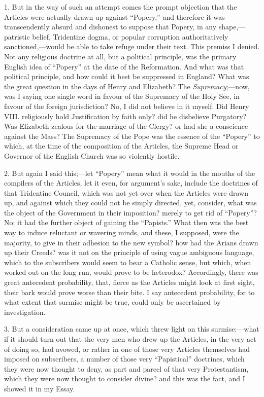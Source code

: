 1. But in the way of such an attempt comes the prompt objection that
the Articles were actually drawn up against ``Popery,'' and
therefore it was transcendently absurd and dishonest to suppose that
Popery, in any shape,—patristic belief, Tridentine dogma, or popular
corruption authoritatively sanctioned,—would be able to take refuge
under their text. This premiss I denied. Not any religious doctrine at
all, but a political principle, was the primary English idea of ``Popery''
at the date of the Reformation. And
what was that political principle, and how could it best be suppressed
in England? What was the great question in the days of Henry and
Elizabeth? The \emph{Supremacy};—now, was I saying one single word in favour
of the Supremacy of the Holy See, in favour of the foreign
jurisdiction? No, I did not believe in it myself. Did Henry VIII.
religiously hold Justification by faith only? did he disbelieve
Purgatory? Was Elizabeth zealous for the marriage of the Clergy? or had
she a conscience against the Mass? The Supremacy of the Pope was the
essence of the ``Popery'' to which, at the time of the composition
of the Articles, the Supreme Head or Governor of the English Church
was so violently hostile.

2. But again I said this;—let ``Popery'' mean what it would
in the mouths of the compilers of the Articles, let it even, for
argument's sake, include the doctrines of that Tridentine Council, which
was not yet over when the Articles were drawn up, and against which they
could not be simply directed, yet, consider, what was the
object of the Government in their imposition? merely to get rid of ``Popery''? No; it had the further object of gaining the
``Papists.'' What then was the best way to induce reluctant or
wavering minds, and these, I supposed, were the majority, to give in
their adhesion to the new symbol? how had the Arians drawn up their
Creeds? was it not on the principle of using vague ambiguous language,
which to the subscribers would seem to bear a Catholic sense, but
which, when worked out on the long run, would prove to be
heterodox? Accordingly, there was great antecedent probability, that,
fierce as the Articles might look at first sight, their bark would prove
worse than their bite. I say antecedent probability, for to what extent
that surmise might be true, could only be ascertained by investigation.

3. But a consideration came up at once, which threw light on this
surmise:—what if it should turn out that the very men who drew up the
Articles, in the very act of doing so, had avowed, or rather in one of
those very Articles themselves had imposed on subscribers, a number of
those very ``Papistical'' doctrines, which they were now thought
to deny, as part and parcel of that very Protestantism, which they were
now thought to consider divine? and this was the fact, and I showed it
in my Essay.

